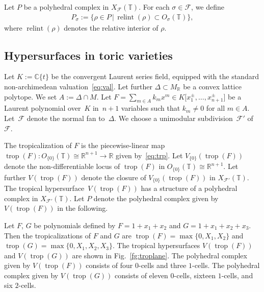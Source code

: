 \documentclass[10pt,a4paper]{amsart}
\numberwithin{equation}{section}
\begin{document}
Let $P$ be a polyhedral complex in $X_{{\mathcal F}}({\mathbb T})$. For each $\sigma \in {\mathcal F}$, we def\/ine
\begin{gather*}
P_\sigma:=\{ \rho \in P \,|\, \operatorname{relint}(\rho) \subset O_\sigma({\mathbb T}) \},
\end{gather*}
where $\operatorname{relint}(\rho)$ denotes the relative interior of $\rho$.

\subsection{Hypersurfaces in toric varieties}\label{sc:2.3}

Let $K := {\mathbb C}\{t\}$ be the convergent Laurent series f\/ield, equipped with the standard non-archi\-me\-dean valuation~\eqref{eq:val}. Let further $\Delta \subset M_{\mathbb R}$ be a convex lattice polytope. We set $A:=\Delta \cap M$. Let $F=\sum\limits_{m \in A} k_m x^m \in K \big[ x^\pm_{1},\dots,x^\pm_{n+1} \big] $ be a Laurent polynomial over~$K$ in~$n+1$ variables such that $k_m \neq 0$ for all $m \in A$. Let~${\mathcal F}$ denote the normal fan to~$\Delta$. We choose a unimodular subdivision~${\mathcal F}'$ of~${\mathcal F}$.

The tropicalization of $F$ is the piecewise-linear map $\operatorname{trop}(F) \colon O_{\{0\}}({\mathbb T}) \cong {\mathbb R}^{n+1} \to {\mathbb R}$ given by~\eqref{eq:trp}. Let $V_{\{0\}}(\operatorname{trop}(F))$ denote the non-dif\/ferentiable locus of $\operatorname{trop}(F)$ in $O_{\{0\}}({\mathbb T}) \cong {\mathbb R}^{n+1}$. Let further $V(\operatorname{trop}(F))$ denote the closure of $V_{\{0\}}(\operatorname{trop}(F))$ in $X_{{\mathcal F}'}({\mathbb T})$. The tropical hypersur\-face~$V(\operatorname{trop}(F))$ has a structure of a polyhedral complex in $X_{{\mathcal F}'}({\mathbb T})$. Let $P$ denote the polyhedral complex given by $V(\operatorname{trop}(F))$ in the following.

\begin{Example} Let $F$, $G$ be polynomials def\/ined by $F=1+x_1+x_2$ and $G=1+x_1+x_2+x_3$. Then the tropicalizations of $F$ and $G$ are $\operatorname{trop}(F)=\max \{ 0, X_1, X_2 \}$ and $\operatorname{trop}(G)=\max \{0, X_1, X_2, X_3\}$. The tropical hypersurfaces $V(\operatorname{trop}(F))$ and $V(\operatorname{trop}(G))$ are shown in Fig.~\ref{fg:troplane}. The polyhedral complex given by $V(\operatorname{trop}(F))$ consists of four $0$-cells and three $1$-cells. The polyhedral complex given by $V(\operatorname{trop}(G))$ consists of eleven $0$-cells, sixteen $1$-cells, and six $2$-cells.
\end{Example}
\end{document}
